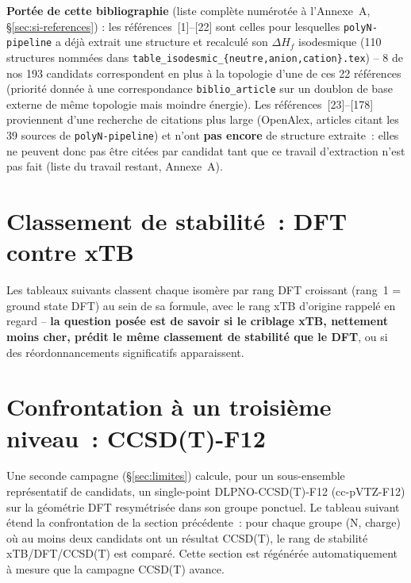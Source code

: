 \documentclass[11pt,a4paper]{article}
\begin{document}
\textbf{Port\'ee de cette bibliographie} (liste compl\`ete num\'erot\'ee
\`a l'Annexe~A, \S\ref{sec:si-references}) : les r\'ef\'erences~[1]--[22]
sont celles pour lesquelles \texttt{polyN-pipeline} a d\'ej\`a extrait une
structure et recalcul\'e son $\Delta H_f$ isodesmique (110 structures
nomm\'ees dans \texttt{table\_isodesmic\_\{neutre,anion,cation\}.tex}) --
8 de nos 193 candidats correspondent en plus \`a la topologie d'une de ces
22 r\'ef\'erences (priorit\'e donn\'ee \`a une correspondance
\texttt{biblio\_article} sur un doublon de base externe de m\^eme
topologie mais moindre \'energie). Les r\'ef\'erences~[23]--[178]
proviennent d'une recherche de citations plus large (OpenAlex, articles
citant les 39 sources de \texttt{polyN-pipeline}) et n'ont \textbf{pas
encore} de structure extraite~: elles ne peuvent donc pas \^etre cit\'ees
par candidat tant que ce travail d'extraction n'est pas fait (liste du
travail restant, Annexe~A).





\section{Classement de stabilit\'e~: DFT contre xTB}
\label{sec:ranking}

Les tableaux suivants classent chaque isom\`ere par rang DFT croissant
(rang~1 = ground state DFT) au sein de sa formule, avec le rang xTB
d'origine rappel\'e en regard -- \textbf{la question pos\'ee est de savoir
si le criblage xTB, nettement moins cher, pr\'edit le m\^eme classement de
stabilit\'e que le DFT}, ou si des r\'eordonnancements significatifs
apparaissent.








\section{Confrontation \`a un troisi\`eme niveau~: CCSD(T)-F12}
\label{sec:ccsdt}

Une seconde campagne (\S\ref{sec:limites}) calcule, pour un sous-ensemble
repr\'esentatif de candidats, un single-point DLPNO-CCSD(T)-F12
(cc-pVTZ-F12) sur la g\'eom\'etrie DFT resym\'etris\'ee dans son groupe
ponctuel. Le tableau suivant \'etend la confrontation de la section
pr\'ec\'edente~: pour chaque groupe (N, charge) o\`u au moins deux
candidats ont un r\'esultat CCSD(T), le rang de stabilit\'e xTB/DFT/CCSD(T)
est compar\'e. Cette section est r\'eg\'en\'er\'ee automatiquement \`a
mesure que la campagne CCSD(T) avance.
\end{document}
